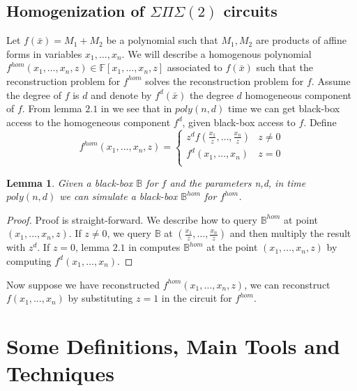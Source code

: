 \documentclass[12pt]{caltech_thesis}
\theoremstyle{plain}
\newtheorem{lemma}{Lemma}
\theoremstyle{definition}
\newcommand{\F}{\mathbb{F}}
\newcommand{\CB}{\mathbb{B}}
\newcommand{\B}[1]{\bar{#1}}
\begin{document}
\section{Homogenization of $\Sigma\Pi\Sigma(2)$ circuits}\label{section:homogenization}
Let $f(\B{x}) = M_1+M_2$ be a polynomial such that $M_1,M_2$ are products of affine forms in variables $x_1,\ldots,x_n$. We will describe
a homogenous polynomial $f^{hom}(x_1,\ldots,x_n,z) \in \F[x_1,\ldots,x_n,z]$ associated to $f(\B{x})$ such that the reconstruction problem 
for $f^{hom}$ solves the reconstruction problem for $f$. Assume the degree of $f$ is $d$ and denote by $f^d(\B{x})$ the degree $d$ homogeneous
component of $f$. From lemma $2.1$ in \cite{Dvir2014} we see that in $poly(n,d)$ time we can get black-box access to the homogeneous component $f^d$, 
given black-box access to $f$. Define
\[
 f^{hom}(x_1,\ldots,x_n,z) = \begin{cases}
     z^df(\frac{x_1}{z},\ldots,\frac{x_n}{z})  &  z\neq 0 \\
       f^d(x_1,\ldots,x_n) & z=0 \\
   \end{cases}
\] 
 
\begin{lemma}
 Given a black-box $\CB$ for $f$ and the parameters n,d, in time $poly(n,d)$ we can simulate a black-box $\CB^{hom}$ for $f^{hom}$.
\end{lemma}
\begin{proof}
 Proof is straight-forward. We describe how to query $\CB^{hom}$ at point $(x_1,\ldots,x_n,z)$. 
 If $z\neq 0$, we query $\CB$ at $(\frac{x_1}{z},\ldots,\frac{x_n}{z})$ and then multiply the result with $z^d$.
 If $z = 0$, lemma $2.1$ in \cite{Dvir2014} computes $\CB^{hom}$ at the point $(x_1,\ldots,x_n,z)$ by computing $f^d(x_1,\ldots,x_n)$. 
\end{proof}

Now suppose we have reconstructed $f^{hom}(x_1,\ldots,x_n,z)$, we can reconstruct $f(x_1,\ldots,x_n)$ by
substituting $z=1$ in the circuit for $f^{hom}$.









\chapter{Some Definitions, Main Tools and Techniques}\label{chapter:sps2definitions}
\end{document}
